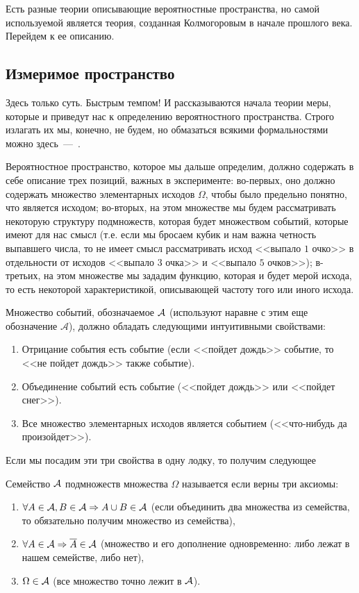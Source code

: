 \documentclass[../TV&MS.tex]{subfiles}
\begin{document}
Есть разные теории описывающие вероятностные пространства, но самой используемой является 
теория, созданная Колмогоровым в начале прошлого века. Перейдем к ее описанию.

\subsection{Измеримое пространство}
	
\qquad Здесь только суть. Быстрым темпом! И рассказываются начала теории меры,
которые и приведут нас к определению вероятностного пространства. Строго излагать их мы, конечно, не будем, но обмазаться всякими формальностями можно здесь~---~\cite{Gusev}.

Вероятностное пространство, которое мы дальше определим, должно 
содержать в себе описание трех позиций, важных в эксперименте: 
во-первых, оно должно содержать множество элементарных исходов $\Omega$,
чтобы было предельно понятно, что является исходом; во-вторых,
на этом множестве мы будем рассматривать некоторую структуру подмножеств,
которая будет множеством событий, которые имеют для нас смысл (т.е.
если мы бросаем кубик и нам важна четность выпавшего числа, то не имеет
смысл рассматривать исход <<выпало $1$ очко>> в отдельности от исходов 
<<выпало $3$ очка>> и <<выпало $5$ очков>>); в-третьих, на этом множестве мы 
зададим функцию, которая и будет мерой исхода, то есть некоторой 
характеристикой, описывающей частоту того или иного исхода.

Множество событий, обозначаемое $\mathcal{A}$ (используют наравне с этим еще обозначение 
$\mathscr{A}$), должно обладать следующими интуитивными свойствами:
\begin{enumerate}
	\item Отрицание события есть событие (если <<пойдет дождь>> событие, 
	то <<не пойдет дождь>> также событие).
	\item Объединение событий есть событие (<<пойдет дождь>> или <<пойдет снег>>).
	\item Все множество элементарных исходов является событием (<<что-нибудь да произойдет>>).
\end{enumerate}

Если мы посадим эти три свойства в одну лодку, то получим следующее 
\begin{Def}
	Семейство $\mathcal{A}$ подмножеств множества $\Omega$  называется  если 
	верны три аксиомы:
\begin{enumerate}[label=(\roman*)]
	\item $\forall A \in \mathcal{A}, B\in \mathcal{A} \Rightarrow A \cup B \in \mathcal{A}$ (если объединить
	два множества из семейства, то обязательно получим множество из семейства),
	\item $\forall A \in \mathcal{A} \Rightarrow \overline{A} \in \mathcal{A}$ (множество и его дополнение
	одновременно: либо лежат в нашем семействе, либо нет),
	\item $\Omega \in \mathcal{A}$ (все множество точно лежит в $\mathcal{A}$).
\end{enumerate}\smallskip
\end{Def}
\end{document}
